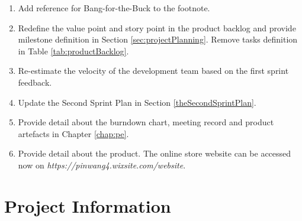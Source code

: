 \documentclass{report}
\begin{document}
\begin{enumerate}
    \item Add reference for Bang-for-the-Buck to the footnote.
    \item Redefine the value point and story point in the product backlog and provide milestone definition in Section \ref{sec:projectPlanning}. Remove tasks definition in Table \ref{tab:productBacklog}.  
    \item Re-estimate the velocity of the development team based on the first sprint feedback.
    \item Update the Second Sprint Plan in Section \ref{theSecondSprintPlan}.
    \item Provide detail about the burndown chart, meeting record and product artefacts in Chapter \ref{chap:pe}.
    \item Provide detail about the product. The online store website can be accessed now on \textit{https://pinwang4.wixsite.com/website}.
  \end{enumerate}

\chapter{Project Information}
\label{projectInformation}
\end{document}
